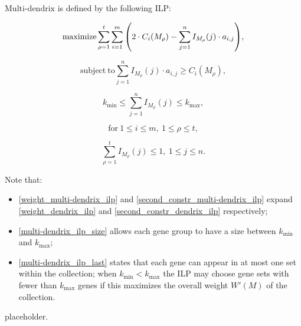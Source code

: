 \begin{definition}
    $\mathrm{Multi}$-$\mathrm{dendrix}$ is defined by the following ILP:

    \begin{equation} \label{weight_multi-dendrix_ilp}
        \mathrm{maximize} \sum_{\rho = 1}^t {\sum_{i = 1}^m {\left(2 \cdot C_i(M_\rho) - \sum_{j = 1}^n I_{M_\rho}(j) \cdot a_{i, j}\right)}},
    \end{equation}

    \begin{equation} \label{second_constr_multi-dendrix_ilp}
        \mathrm{subject \ to} \sum_{j = 1}^n I_{M_\rho}(j) \cdot {a_{i, j}} \ge C_i(M_\rho),
    \end{equation}

    \begin{equation} \label{multi-dendrix_ilp_size}
        k_\mathrm{min} \le \sum_{j = 1}^n {I_{M_\rho}(j)} \le k_\mathrm{max},
    \end{equation}
    
    \begin{equation*}
        \mathrm{for\ } 1 \le i \le m, \ 1 \le \rho \le t,
    \end{equation*}

    \begin{equation} \label{multi-dendrix_ilp_last}
        \sum_{\rho = 1}^t{I_{M_\rho}(j)} \le 1, \ 1 \le j \le n.
    \end{equation}
\end{definition}

Note that:

\begin{itemize}
    \item \cref{weight_multi-dendrix_ilp} and \cref{second_constr_multi-dendrix_ilp} expand \cref{weight_dendrix_ilp} and \cref{second_constr_dendrix_ilp} respectively;
    \item \cref{multi-dendrix_ilp_size} allows each gene group to have a size between $k_\mathrm{min}$ and $k_\mathrm{max}$;
    \item \cref{multi-dendrix_ilp_last} states that each gene can appear in at most one set within the collection; when $k_\mathrm{min} < k_\mathrm{max}$ the ILP may choose gene sets with fewer than $k_\mathrm{max}$ genes if this maximizes the overall weight $W'(M)$ of the collection.
\end{itemize}

placeholder. 


